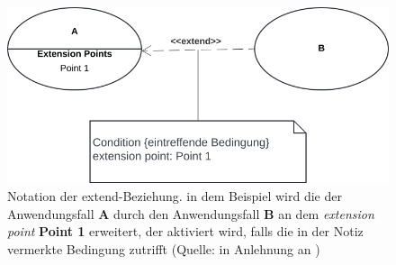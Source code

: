 \begin{figure}
    \centering
    \includegraphics[scale=0.4]{part three/Anwendungsfalldiagramm/img/usecase-extend}
    \caption{Notation der extend-Beziehung. in dem Beispiel wird die der Anwendungsfall \textbf{A} durch den Anwendungsfall \textbf{B} an dem \textit{extension point} \textbf{Point 1} erweitert, der aktiviert wird, falls die in der Notiz vermerkte Bedingung zutrifft (Quelle: in Anlehnung an \cite[65, Abb. 2.8-4]{Bal05})}
    \label{fig:usecase-extend-cc}
\end{figure}
